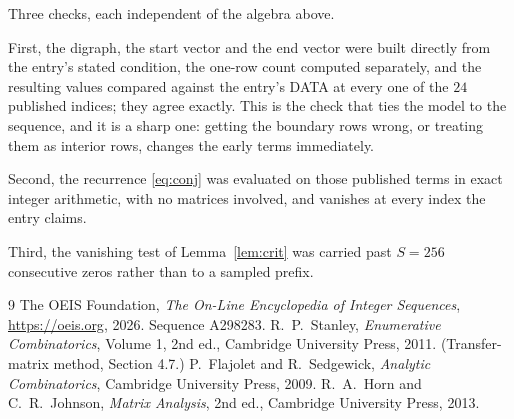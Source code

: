 \documentclass[11pt,a4paper]{article}
\theoremstyle{plain}
\theoremstyle{definition}
\begin{document}
Three checks, each independent of the algebra above.

First, the digraph, the start vector and the end vector were built directly from the
entry's stated condition, the one-row count computed separately, and the resulting values
compared against the entry's DATA at every one of the $24$ published indices; they
agree exactly. This is the check that ties the model to the sequence, and it is a sharp one:
getting the boundary rows wrong, or treating them as interior rows, changes the early terms
immediately.

Second, the recurrence \eqref{eq:conj} was evaluated on those published terms in exact
integer arithmetic, with no matrices involved, and vanishes at every index the entry claims.

Third, the vanishing test of Lemma~\ref{lem:crit} was carried past $S=256$ consecutive
zeros rather than to a sampled prefix.

\begin{thebibliography}{9}
 The OEIS Foundation, \emph{The On-Line Encyclopedia of Integer
Sequences}, \url{https://oeis.org}, 2026. Sequence A298283.
 R.~P.~Stanley, \emph{Enumerative Combinatorics}, Volume 1, 2nd ed.,
Cambridge University Press, 2011. (Transfer-matrix method, Section 4.7.)
 P.~Flajolet and R.~Sedgewick, \emph{Analytic Combinatorics}, Cambridge
University Press, 2009.
 R.~A.~Horn and C.~R.~Johnson, \emph{Matrix Analysis}, 2nd ed., Cambridge
University Press, 2013.
\end{thebibliography}
\end{document}
